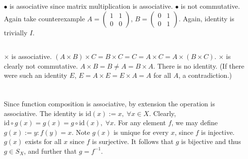 \documentclass{article}
\begin{document}
\subsection{}
$\bullet$ is associative since matrix multiplication is associative. $\bullet$ is not commutative. Again take counterexample $A = \left( \begin{matrix} 1 & 1 \\ 0 & 0 \end{matrix} \right)$, $B = \left( \begin{matrix} 0 & 1 \\ 0 & 1 \end{matrix} \right)$. Again, identity is trivially $I$.

\subsection{}
$\times$ is associative. $(A \times B) \times C = B \times C = C = A \times C = A \times (B \times C)$. $\times$ is clearly not commutative. $A \times B = B \neq A = B \times A$. There is no identity. (If there were such an identity $E$, $E = A \times E = E \times A = A$ for all $A$, a contradiction.)

\section{}
Since function composition is associative, by extension the operation is associative. The identity is $\mathrm{id}(x):=x, \; \forall x \in X$. Clearly, $\mathrm{id}\circ g(x) = g(x) = g\circ \mathrm{id}(x), \; \forall x$. For any element $f$, we may define $g(x):=y : f(y) = x$. Note $g(x)$ is unique for every $x$, since $f$ is injective. $g(x)$ exists for all $x$ since $f$ is surjective. It follows that $g$ is bijective and thus $g \in S_X$, and further that $g = f^{-1}$.
\end{document}
